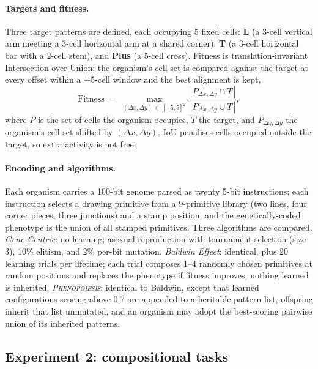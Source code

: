 \documentclass[11pt]{article}
\newcommand{\Pheno}{\textsc{Phenopoiesis}}
\begin{document}
\paragraph{Targets and fitness.}
Three target patterns are defined, each occupying 5 fixed cells: \textbf{L}
(a 3-cell vertical arm meeting a 3-cell horizontal arm at a shared corner),
\textbf{T} (a 3-cell horizontal bar with a 2-cell stem), and \textbf{Plus} (a
5-cell cross). Fitness is translation-invariant Intersection-over-Union: the
organism's cell set is compared against the target at every offset within a
$\pm5$-cell window and the best alignment is kept,
\begin{equation}
\mathrm{Fitness} \;=\; \max_{(\Delta x,\Delta y)\,\in\,[-5,5]^2}
\frac{|\,P_{\Delta x,\Delta y} \cap T\,|}{|\,P_{\Delta x,\Delta y} \cup T\,|},
\end{equation}
where $P$ is the set of cells the organism occupies, $T$ the target, and
$P_{\Delta x,\Delta y}$ the organism's cell set shifted by
$(\Delta x,\Delta y)$. IoU penalises cells occupied outside the target, so
extra activity is not free.

\paragraph{Encoding and algorithms.}
Each organism carries a 100-bit genome parsed as twenty 5-bit instructions;
each instruction selects a drawing primitive from a 9-primitive library (two
lines, four corner pieces, three junctions) and a stamp position, and the
genetically-coded phenotype is the union of all stamped primitives. Three
algorithms are compared. \emph{Gene-Centric}: no learning; asexual
reproduction with tournament selection (size 3), 10\% elitism, and 2\%
per-bit mutation. \emph{Baldwin Effect}: identical, plus 20 learning trials
per lifetime; each trial composes 1--4 randomly chosen primitives at random
positions and replaces the phenotype if fitness improves; nothing learned is
inherited. \emph{\Pheno{}}: identical to Baldwin, except that learned
configurations scoring above 0.7 are appended to a heritable pattern list,
offspring inherit that list unmutated, and an organism may adopt the
best-scoring pairwise union of its inherited patterns.

\subsection{Experiment 2: compositional tasks}
\label{sec:exp2}
\end{document}
